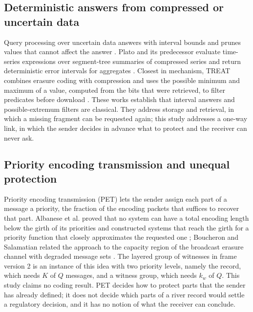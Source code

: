 \subsection{Deterministic answers from compressed or uncertain data}
Query processing over uncertain data answers with interval bounds and prunes values that cannot affect the answer \citep{cheng2003probabilistic}. Plato and its predecessor evaluate time-series expressions over segment-tree summaries of compressed series and return deterministic error intervals for aggregates \citep{brito2017platodb,lin2019plato}. Closest in mechanism, TREAT combines erasure coding with compression and uses the possible minimum and maximum of a value, computed from the bits that were retrieved, to filter predicates before download \citep{taurone2024treat}. These works establish that interval answers and possible-extremum filters are classical. They address storage and retrieval, in which a missing fragment can be requested again; this study addresses a one-way link, in which the sender decides in advance what to protect and the receiver can never ask.

\subsection{Priority encoding transmission and unequal protection}
Priority encoding transmission (PET) lets the sender assign each part of a message a priority, the fraction of the encoding packets that suffices to recover that part. Albanese et al. proved that no system can have a total encoding length below the girth of its priorities and constructed systems that reach the girth for a priority function that closely approximates the requested one \citep{albanese1996}; Boucheron and Salamatian related the approach to the capacity region of the broadcast erasure channel with degraded message sets \citep{boucheron2000pet}. The layered group of witnesses in frame version 2 is an instance of this idea with two priority levels, namely the record, which needs $K$ of $Q$ messages, and a witness group, which needs $k_w$ of $Q$. This study claims no coding result. PET decides how to protect parts that the sender has already defined; it does not decide which parts of a river record would settle a regulatory decision, and it has no notion of what the receiver can conclude.

